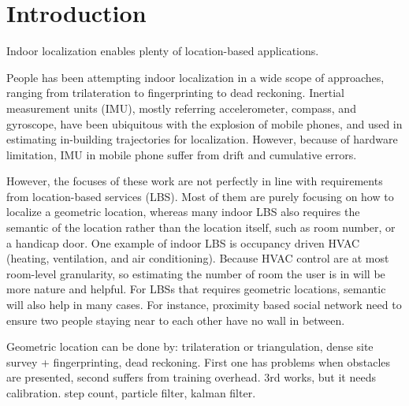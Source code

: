 \section{Introduction}
\label{sec:intro}


Indoor localization enables plenty of location-based applications. 



% 
People has been attempting indoor localization in a wide scope of approaches, ranging from 
trilateration to fingerprinting to dead reckoning. Inertial measurement units (IMU), 
mostly referring accelerometer, 
compass, and gyroscope, have been ubiquitous with the explosion of mobile phones, and used in
estimating in-building trajectories for localization. However, because of hardware limitation, 
IMU in mobile phone suffer from drift and cumulative errors. 



However, the focuses of these work are not perfectly in line with requirements from location-based services (LBS). 
Most of them are purely focusing on how to localize a geometric location, whereas 
many indoor LBS also requires the semantic of the location rather than the location itself, such as room number,
or a handicap door.  
One example of indoor LBS is occupancy driven HVAC (heating, ventilation, and air conditioning).
Because HVAC control are at most room-level granularity, so estimating the number of room the 
user is in will be more nature and helpful. For LBSs that requires geometric locations, semantic will also help
in many cases. For instance, proximity based social network \fxnote{[cite]} need to ensure two people staying near
to each other have no wall in between. 



Geometric location can be done by: trilateration or triangulation, dense site survey + fingerprinting, dead reckoning.
First one has problems when obstacles are presented, second suffers from training overhead. 3rd works, but it needs calibration. 
step count, particle filter, kalman filter.


